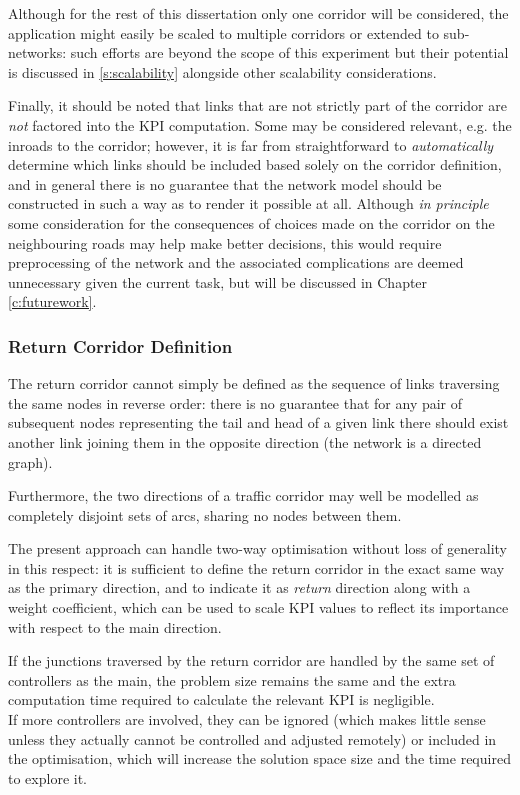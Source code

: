 Although for the rest of this dissertation only one corridor will be considered, the application might easily be scaled to multiple corridors or extended to sub-networks: such efforts are beyond the scope of this experiment but their potential is discussed in \ref{s:scalability} alongside other scalability considerations.

Finally, it should be noted that links that are not strictly part of the corridor are \emph{not} factored into the KPI computation. Some may be considered relevant, e.g. the inroads to the corridor; however, it is far from straightforward to \emph{automatically} determine which links should be included based solely on the corridor definition, and in general there is no guarantee that the network model should be constructed in such a way as to render it possible at all. Although \emph{in principle} some consideration for the consequences of choices made on the corridor on the neighbouring roads may help make better decisions, this would require preprocessing of the network and the associated complications are deemed unnecessary given the current task, but will be discussed in Chapter \ref{c:futurework}.

\subsubsection*{Return Corridor Definition}
The return corridor cannot simply be defined as the sequence of links traversing the same nodes in reverse order: there is no guarantee that for any pair of subsequent nodes representing the tail and head of a given link there should exist another link joining them in the opposite direction (the network is a directed graph).

Furthermore, the two directions of a traffic corridor may well be modelled as completely disjoint sets of arcs, sharing no nodes between them.

The present approach can handle two-way optimisation without loss of generality in this respect: it is sufficient to define the return corridor in the exact same way as the primary direction, and to indicate it as \emph{return} direction along with a weight coefficient, which can be used to scale KPI values to reflect its importance with respect to the main direction.

If the junctions traversed by the return corridor are handled by the same set of controllers as the main, the problem size remains the same and the extra computation time required to calculate the relevant KPI is negligible. \\
If more controllers are involved, they can be ignored (which makes little sense unless they actually cannot be controlled and adjusted remotely) or included in the optimisation, which will increase the solution space size and the time required to explore it.


